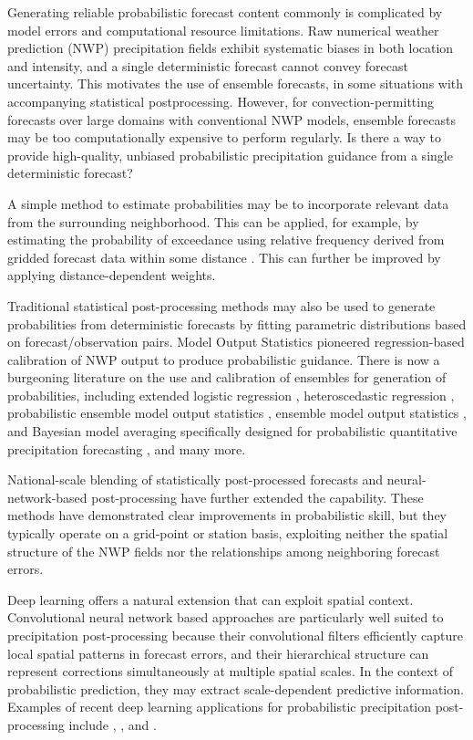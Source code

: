 \documentclass[11pt]{article}
\begin{document}
Generating reliable probabilistic forecast content commonly is complicated by
model errors and computational resource limitations.
Raw numerical weather prediction (NWP) precipitation
fields exhibit systematic biases in both location and intensity, and
a single deterministic forecast cannot convey forecast uncertainty.
This motivates the use of ensemble forecasts, in some situations
with accompanying statistical postprocessing.
However, for convection-permitting forecasts over large domains with
conventional NWP models, ensemble forecasts may be too computationally expensive to
perform regularly.    Is there a way to provide high-quality, unbiased probabilistic
precipitation guidance from a single deterministic forecast?

A simple method to estimate probabilities may be to incorporate relevant data from the
surrounding neighborhood.   This can be applied,
for example, by estimating the probability of exceedance using relative frequency
derived from gridded forecast data within some distance \citep{theis2005}.  This can further be improved
by applying distance-dependent weights.

Traditional statistical post-processing methods may also be used to generate probabilities
from deterministic forecasts by fitting parametric distributions based on
forecast/observation pairs.  Model Output Statistics
\citep[MOS;][]{glahn1972, carter1989} pioneered regression-based
calibration of NWP output to produce probabilistic guidance.
There is now a burgeoning literature on the use and calibration of
ensembles for generation of probabilities, including extended
logistic regression \citep{bentzien2012, benbouall2013},
heteroscedastic regression \citep{messner2014}, probabilistic ensemble
model output statistics \citep[EMOS;][]{scheuerer2014, scheuerer2015}, ensemble
model output statistics \citep{hamill2004}, and Bayesian model
averaging specifically designed for probabilistic quantitative
precipitation forecasting \citep[BMA--PQPF;][]{sloughter2007}, and many more.

National-scale blending of statistically post-processed forecasts
\citep{hamill2017} and neural-network-based post-processing
\citep{hamill2018, ghazvinian2022} have further extended the
capability.  These methods have demonstrated clear improvements in
probabilistic skill, but they typically operate on a grid-point or
station basis, exploiting neither the spatial structure of the NWP
fields nor the relationships among neighboring forecast errors.

Deep learning offers a natural extension that can exploit
spatial context.  Convolutional neural network based 
approaches \citep[CNNs;][]{lecun1998} are
particularly well suited to precipitation post-processing because
their convolutional filters efficiently capture local spatial
patterns in forecast errors, and
their hierarchical structure can represent corrections
simultaneously at multiple spatial scales.  In the context of
probabilistic prediction, they may extract scale-dependent
predictive information.  Examples of recent deep learning
applications for probabilistic precipitation post-processing
include \citet{chapman2022}, \citet{badrinath2023}, and
\citet{hu2023}.
\end{document}

